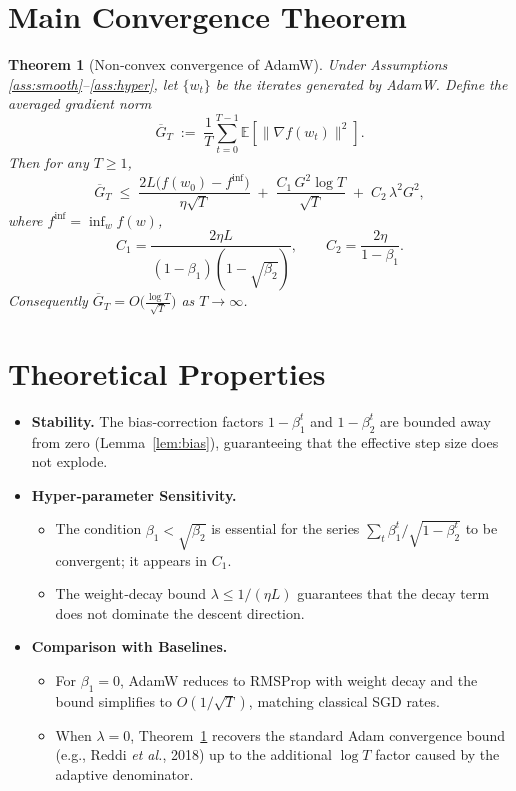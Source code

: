 \documentclass{article}
\newtheorem{theorem}{Theorem}
\newcommand{\E}{\mathbb{E}}
\begin{document}
\section*{Main Convergence Theorem}
\begin{theorem}[Non‑convex convergence of AdamW]\label{thm:main}
Under Assumptions \ref{ass:smooth}–\ref{ass:hyper}, let $\{w_{t}\}$ be the iterates generated by AdamW.
Define the averaged gradient norm
\[
\overline{G}_{T}\;:=\;
\frac{1}{T}\sum_{t=0}^{T-1}\E\!\left[\big\|\nabla f(w_{t})\big\|^{2}\right].
\]
Then for any $T\ge1$,
\[
\boxed{\;
\overline{G}_{T}\;\le\;
\frac{2L\big(f(w_{0})-f^{\inf}\big)}{\eta\sqrt{T}}
\;+\;
\frac{C_{1}\,G^{2}\log T}{\sqrt{T}}
\;+\;
C_{2}\,\lambda^{2}G^{2},
\;}
\]
where $f^{\inf}=\inf_{w}f(w)$,
\[
C_{1}= \frac{2\eta L}{(1-\beta_{1})(1-\sqrt{\beta_{2}})} ,
\qquad
C_{2}= \frac{2\eta}{1-\beta_{1}} .
\]
Consequently $\overline{G}_{T}=O\!\big(\tfrac{\log T}{\sqrt{T}}\big)$ as $T\to\infty$.
\end{theorem}

\section*{Theoretical Properties}
\begin{itemize}[leftmargin=*]
\item \textbf{Stability.} The bias‑correction factors $1-\beta_{1}^{t}$ and $1-\beta_{2}^{t}$ are bounded away from zero (Lemma~\ref{lem:bias}), guaranteeing that the effective step size does not explode.
\item \textbf{Hyper‑parameter Sensitivity.}
    \begin{itemize}
    \item The condition $\beta_{1}<\sqrt{\beta_{2}}$ is essential for the series $\sum_{t}\beta_{1}^{t}/\sqrt{1-\beta_{2}^{t}}$ to be convergent; it appears in $C_{1}$.
    \item The weight‑decay bound $\lambda\le 1/(\eta L)$ guarantees that the decay term does not dominate the descent direction.
    \end{itemize}
\item \textbf{Comparison with Baselines.}
    \begin{itemize}
    \item For $\beta_{1}=0$, AdamW reduces to RMSProp with weight decay and the bound simplifies to $O(1/\sqrt{T})$, matching classical SGD rates.
    \item When $\lambda=0$, Theorem~\ref{thm:main} recovers the standard Adam convergence bound (e.g., Reddi \emph{et al.}, 2018) up to the additional $\log T$ factor caused by the adaptive denominator.
    \end{itemize}
\end{itemize}
\end{document}
